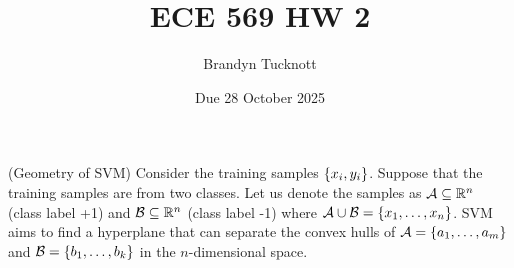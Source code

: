 \documentclass{exam}
\title{ECE 569 HW 2}
\author{Brandyn Tucknott}
\date{Due 28 October 2025}
\begin{document}
\maketitle

\begin{questions}
    \question (Geometry of SVM) Consider the training samples $\left \{ x_i, y_i \right \}$. Suppose that the training samples are from two
    classes. Let us denote the samples as $\mathcal{A}\subseteq \mathbb {R}^n$ (class label +1) and $\mathcal{B}\subseteq\mathbb {R}^n$ (class label -1)
    where $\mathcal{A}\cup\mathcal{B} = \left \{ x_1, \hdots, x_n \right \}$. SVM aims to find a hyperplane that can separate the convex hulls
    of $\mathcal{A} = \left \{ a_1, \hdots, a_m \right \}$ and $\mathcal{B} = \left \{ b_1, \hdots, b_k \right \}$ in the $n$-dimensional space.


    \newpage
    \question


    \newpage
    \question


    \newpage
    \question


\end{questions}
\end{document}
